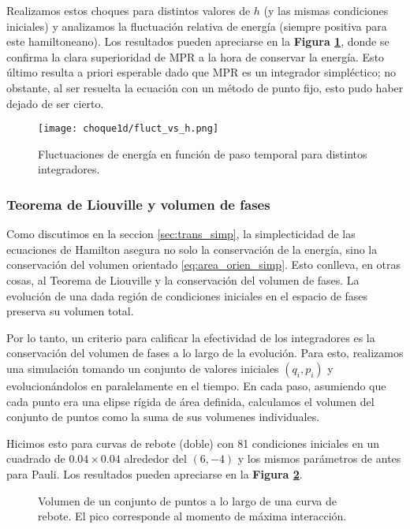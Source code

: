 Realizamos estos choques para distintos valores de $h$ (y las mismas condiciones iniciales) y analizamos la fluctuación relativa de energía (siempre positiva para este hamiltoneano).
Los resultados pueden apreciarse en la \textbf{Figura \ref{fig:flucvsh}}, donde se confirma la clara superioridad de MPR a la hora de conservar la energía.
Esto último resulta a priori esperable dado que MPR es un integrador simpléctico; no obstante, al ser resuelta la ecuación con un método de punto fijo, esto pudo haber dejado de ser cierto.

\begin{figure}[h]
	\centering
	\texttt{[image: choque1d/fluct\_vs\_h.png]}
	\caption{Fluctuaciones de energía en función de paso temporal para distintos integradores.}
	\label{fig:flucvsh}
\end{figure}

\subsubsection{Teorema de Liouville y volumen de fases}

Como discutimos en la seccion \ref{sec:trans_simp}, la simplecticidad de las ecuaciones de Hamilton asegura no solo la conservación de la energía, sino la conservación del volumen orientado \eqref{eq:area_orien_simp}.
Esto conlleva, en otras cosas, al Teorema de Liouville y la conservación del volumen de fases.
La evolución de una dada región de condiciones iniciales en el espacio de fases preserva su volumen total.

Por lo tanto, un criterio para calificar la efectividad de los integradores es la conservación del volumen de fases a lo largo de la evolución.
Para esto, realizamos una simulación tomando un conjunto de valores iniciales $(q_i, p_i)$ y evolucionándolos en paralelamente en el tiempo.
En cada paso, asumiendo que cada punto era una elipse rígida de área definida, calculamos el volumen del conjunto de puntos como la suma de sus volumenes individuales.

Hicimos esto para curvas de rebote (doble) con 81 condiciones iniciales en un cuadrado de $0.04\times0.04$ alrededor del $(6, -4)$ y los mismos parámetros de antes para Pauli.
Los resultados pueden apreciarse en la \textbf{Figura \ref{fig:vol_fas}}.

\begin{figure}[h]
	\centering
	\caption{Volumen de un conjunto de puntos a lo largo de una curva de rebote. El pico corresponde al momento de máxima interacción.}
	\label{fig:vol_fas}
\end{figure}

